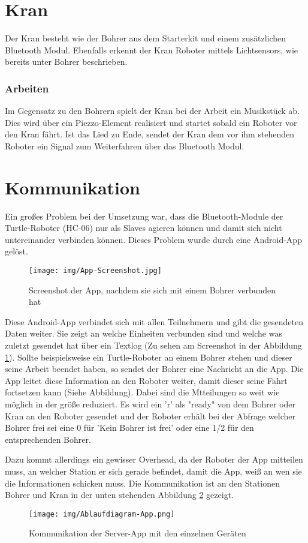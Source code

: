 \section{Kran}
Der Kran besteht wie der Bohrer aus dem Starterkit und einem zusätzlichen Bluetooth Modul. Ebenfalls erkennt der Kran Roboter mittels Lichtsensors, wie bereits unter Bohrer beschrieben.
\subsubsection{Arbeiten}
Im Gegensatz zu den Bohrern spielt der Kran bei der Arbeit ein Musikstück ab. Dies wird über ein Piezzo-Element realisiert und startet sobald ein Roboter vor den Kran fährt. Ist das Lied zu Ende, sendet der Kran dem vor ihm stehenden Roboter ein Signal zum Weiterfahren über das Bluetooth Modul.

\section{Kommunikation}
Ein großes Problem bei der Umsetzung war, dass die Bluetooth-Module der Turtle-Roboter (HC-06) nur als Slaves agieren können und damit sich nicht untereinander verbinden können. Dieses Problem wurde durch eine Android-App gelöst.
\begin{figure}[h]
\begin{center}
\texttt{[image: img/App-Screenshot.jpg]}
\caption{Screenshot der App, nachdem sie sich mit einem Bohrer verbunden hat}\label{screen_app}
\end{center}
\end{figure}

Diese Android-App verbindet sich mit allen Teilnehmern und gibt die gesendeten Daten weiter. Sie zeigt an welche Einheiten verbunden sind und welche was zuletzt gesendet hat über ein Textlog (Zu sehen am Screenshot in der Abbildung \ref{screen_app}). Sollte beispielsweise ein Turtle-Roboter an einem Bohrer stehen und dieser seine Arbeit beendet haben, so sendet der Bohrer eine Nachricht an die App. Die App leitet diese Information an den Roboter weiter, damit dieser seine Fahrt fortsetzen kann (Siehe Abbildung). Dabei sind die Mtteilungen so weit wie möglich in der größe reduziert. Es wird ein 'r' als "ready" von dem Bohrer oder Kran an den Roboter gesendet und der Roboter erhält bei der Abfrage welcher Bohrer frei sei eine 0 für 'Kein Bohrer ist frei' oder eine 1/2 für den entsprechenden Bohrer.

Dazu kommt allerdings ein gewisser Overhead, da der Roboter der App mitteilen muss, an welcher Station er sich gerade befindet, damit die App, weiß an wen sie die Informationen schicken muss. Die Kommunikation ist an den Stationen Bohrer und Kran in der unten stehenden Abbildung \ref{ablauf_app} gezeigt.
\begin{figure}[h]
\begin{center}
\texttt{[image: img/Ablaufdiagram-App.png]}
\caption{Kommunikation der Server-App mit den einzelnen Geräten} \label{ablauf_app}
\end{center}
\end{figure}